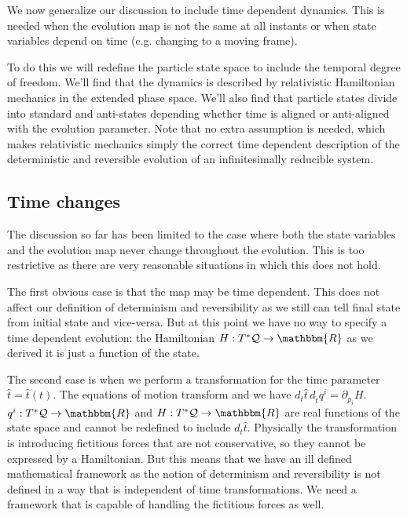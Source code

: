 \documentclass[aps,pra,10pt,twocolumn,floatfix,nofootinbib]{revtex4-1}
\numberwithin{equation}{section}
\theoremstyle{definition}
\begin{document}
We now generalize our discussion to include time dependent dynamics. This is needed when the evolution map is not the same at all instants or when state variables depend on time (e.g. changing to a moving frame).

To do this we will redefine the particle state space to include the temporal degree of freedom. We'll find that the dynamics is described by relativistic Hamiltonian mechanics in the extended phase space. We'll also find that particle states divide into standard and anti-states depending whether time is aligned or anti-aligned with the evolution parameter. Note that no extra assumption is needed, which makes relativistic mechanics simply the correct time dependent description of the deterministic and reversible evolution of an infinitesimally reducible system.

\subsection{Time changes}

The discussion so far has been limited to the case where both the state variables and the evolution map never change throughout the evolution. This is too restrictive as there are very reasonable situations in which this does not hold.

The first obvious case is that the map may be time dependent. This does not affect our definition of determinism and reversibility as we still can tell final state from initial state and vice-versa. But at this point we have no way to specify a time dependent evolution: the Hamiltonian $H: T^*\mathcal{Q} \rightarrow \mathbbm{R}$ as we derived it is just a function of the state.

The second case is when we perform a transformation for the time parameter $\hat{t}=\hat{t}(t)$. The equations of motion transform and we have $d_{t}\hat{t} \, d_{\hat{t}}q^i = \partial_{p_i} H$. $q^i: T^*\mathcal{Q} \rightarrow \mathbbm{R}$ and $H: T^*\mathcal{Q} \rightarrow \mathbbm{R}$ are real functions of the state space and cannot be redefined to include $d_{t}\hat{t}$. Physically the transformation is introducing fictitious forces that are not conservative, so they cannot be expressed by a Hamiltonian. But this means that we have an ill defined mathematical framework as the notion of determinism and reversibility is not defined in a way that is independent of time transformations. We need a framework that is capable of handling the fictitious forces as well.
\end{document}
